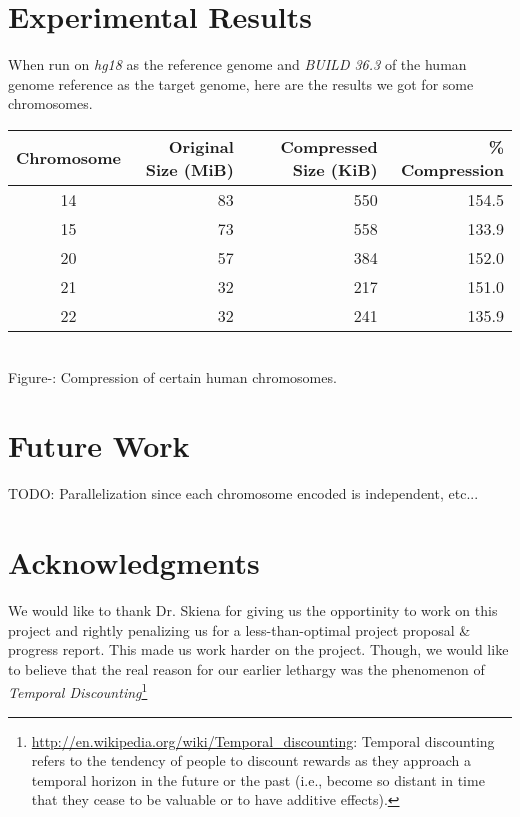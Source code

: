 \documentclass[11pt]{article}
\newcounter{fignum}
\begin{document}
\section{Experimental Results}

When run on \textit{hg18} as the reference genome and \textit{BUILD
  36.3} of the human genome reference as the target genome, here are
the results we got for some chromosomes.

\begin{center}
  \begin{tabular}{|c|r|r|r|}
    \hline
    Chromosome & Original Size (MiB) & Compressed Size (KiB) & \% Compression\\
    \hline
    14 & 83 & 550 & 154.5\\
    \hline
    15 & 73 & 558 & 133.9\\
    \hline
    20 & 57 & 384 & 152.0\\
    \hline
    21 & 32 & 217 & 151.0\\
    \hline
    22 & 32 & 241 & 135.9\\
    \hline
  \end{tabular}\\
  \vspace{0.3cm}
  \footnotesize{Figure-: Compression of certain human chromosomes.}
  \addtocounter{fignum}{1}
\end{center}


\section{Future Work}

TODO: Parallelization since each chromosome encoded is independent,
etc...

\section{Acknowledgments}

We would like to thank Dr. Skiena for giving us the opportinity to
work on this project and rightly penalizing us for a less-than-optimal
project proposal \& progress report. This made us work harder on the
project. Though, we would like to believe that the real reason for our
earlier lethargy was the phenomenon of \textit{Temporal
  Discounting}\footnote{\url{http://en.wikipedia.org/wiki/Temporal_discounting}:
  Temporal discounting refers to the tendency of people to discount
  rewards as they approach a temporal horizon in the future or the
  past (i.e., become so distant in time that they cease to be valuable
  or to have additive effects).}
\end{document}
